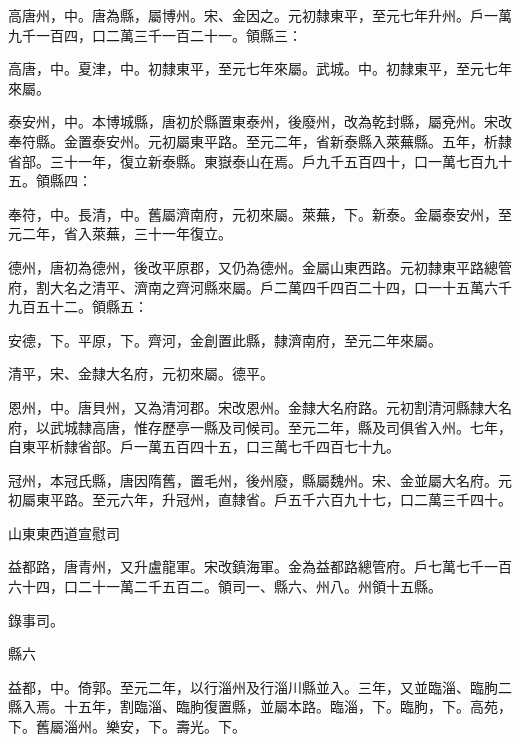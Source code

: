 \begin{pinyinscope}
 高唐州，中。唐為縣，屬博州。宋、金因之。元初隸東平，至元七年升州。戶一萬九千一百四，口二萬三千一百二十一。領縣三：



 高唐，中。夏津，中。初隸東平，至元七年來屬。武城。中。初隸東平，至元七年來屬。



 泰安州，中。本博城縣，唐初於縣置東泰州，後廢州，改為乾封縣，屬兗州。宋改奉符縣。金置泰安州。元初屬東平路。至元二年，省新泰縣入萊蕪縣。五年，析隸省部。三十一年，復立新泰縣。東嶽泰山在焉。戶九千五百四十，口一萬七百九十五。領縣四：



 奉符，中。長清，中。舊屬濟南府，元初來屬。萊蕪，下。新泰。金屬泰安州，至元二年，省入萊蕪，三十一年復立。



 德州，唐初為德州，後改平原郡，又仍為德州。金屬山東西路。元初隸東平路總管府，割大名之清平、濟南之齊河縣來屬。戶二萬四千四百二十四，口一十五萬六千九百五十二。領縣五：



 安德，下。平原，下。齊河，金創置此縣，隸濟南府，至元二年來屬。



 清平，宋、金隸大名府，元初來屬。德平。



 恩州，中。唐貝州，又為清河郡。宋改恩州。金隸大名府路。元初割清河縣隸大名府，以武城隸高唐，惟存歷亭一縣及司候司。至元二年，縣及司俱省入州。七年，自東平析隸省部。戶一萬五百四十五，口三萬七千四百七十九。



 冠州，本冠氏縣，唐因隋舊，置毛州，後州廢，縣屬魏州。宋、金並屬大名府。元初屬東平路。至元六年，升冠州，直隸省。戶五千六百九十七，口二萬三千四十。



 山東東西道宣慰司



 益都路，唐青州，又升盧龍軍。宋改鎮海軍。金為益都路總管府。戶七萬七千一百六十四，口二十一萬二千五百二。領司一、縣六、州八。州領十五縣。



 錄事司。



 縣六



 益都，中。倚郭。至元二年，以行淄州及行淄川縣並入。三年，又並臨淄、臨朐二縣入焉。十五年，割臨淄、臨朐復置縣，並屬本路。臨淄，下。臨朐，下。高苑，下。舊屬淄州。樂安，下。壽光。下。




\end{pinyinscope}
